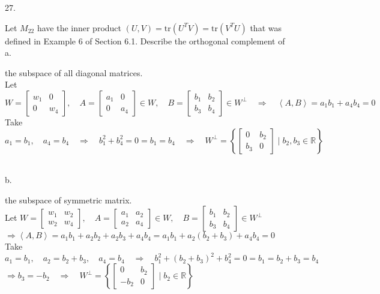 \documentclass[12pt]{book}
\begin{document}
\begin{CJK}{UTF8}{bsmi}
27. \begin{minipage}[t]{\dimexpr\linewidth}
Let $M_{22}$ have the inner product $(U,V)=\mathrm{tr}(U^TV)=\mathrm{tr}(V^TU)$ that was defined in Example 6 of Section 6.1. Describe the orthogonal complement of \\
a. \begin{minipage}[t]{\dimexpr\linewidth}
the subspace of all diagonal matrices. \\
Let $W=\begin{bmatrix}
w_1 & 0 \\
0 & w_4
\end{bmatrix},\quad A=\begin{bmatrix}
a_1 & 0 \\
0 & a_4
\end{bmatrix}\in W,\quad B=\begin{bmatrix}
b_1 & b_2 \\
b_3 & b_4
\end{bmatrix}\in W^\perp\quad\Rightarrow\quad\left\langle A, B \right\rangle=a_1b_1+a_4b_4=0$ \\
Take $a_1=b_1,\quad a_4=b_4\quad\Rightarrow\quad b_1^2+b_4^2=0=b_1=b_4\quad\Rightarrow\quad W^\perp=\left\{\begin{bmatrix}
0 & b_2 \\
b_3 & 0
\end{bmatrix}\mid b_2,b_3\in\mathbb{R}\right\}$
\end{minipage} \\
b. \begin{minipage}[t]{\dimexpr\linewidth}
the subspace of symmetric matrix. \\
Let $W=\begin{bmatrix}
w_1 & w_2 \\
w_2 & w_4
\end{bmatrix},\quad A=\begin{bmatrix}
a_1 & a_2 \\
a_2 & a_4
\end{bmatrix}\in W,\quad B=\begin{bmatrix}
b_1 & b_2 \\
b_3 & b_4
\end{bmatrix}\in W^\perp$ \\
$\Rightarrow\left\langle A, B \right\rangle=a_1b_1+a_2b_2+a_2b_3+a_4b_4=a_1b_1+a_2(b_2+b_3)+a_4b_4=0$ \\
Take $a_1=b_1,\quad a_2=b_2+b_3,\quad a_4=b_4\quad\Rightarrow\quad b_1^2+(b_2+b_3)^2+b_4^2=0=b_1=b_2+b_3=b_4$ \\
$\Rightarrow b_3=-b_2\quad\Rightarrow\quad W^\perp=\left\{\begin{bmatrix}
0 & b_2 \\
-b_2 & 0
\end{bmatrix}\mid b_2\in\mathbb{R}\right\}$
\end{minipage}
\end{minipage}


\end{CJK}
\end{document}

